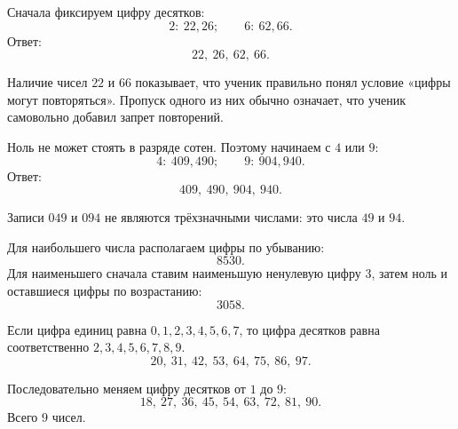 
\clearpage
{}

\begin{teacheranswer}[Задание 1]
  Сначала фиксируем цифру десятков:
  \[
    2:\ 22,26;\qquad 6:\ 62,66.
  \]
  Ответ:
  \[
    \boxed{22,\ 26,\ 62,\ 66}.
  \]
\end{teacheranswer}

\begin{criterionbox}
  Наличие чисел \(22\) и \(66\) показывает, что ученик правильно понял
  условие «цифры могут повторяться». Пропуск одного из них обычно означает,
  что ученик самовольно добавил запрет повторений.
\end{criterionbox}

\begin{teacheranswer}[Задание 2]
  Ноль не может стоять в разряде сотен. Поэтому начинаем с \(4\) или \(9\):
  \[
    4:\ 409,490;\qquad 9:\ 904,940.
  \]
  Ответ:
  \[
    \boxed{409,\ 490,\ 904,\ 940}.
  \]
\end{teacheranswer}

\begin{criterionbox}
  Записи \(049\) и \(094\) не являются трёхзначными числами: это числа
  \(49\) и \(94\).
\end{criterionbox}

\begin{teacheranswer}[Задание 3]
  Для наибольшего числа располагаем цифры по убыванию:
  \[
    \boxed{8530}.
  \]
  Для наименьшего сначала ставим наименьшую ненулевую цифру \(3\), затем
  ноль и оставшиеся цифры по возрастанию:
  \[
    \boxed{3058}.
  \]
\end{teacheranswer}

\begin{teacheranswer}[Задание 4]
  Если цифра единиц равна \(0,1,2,3,4,5,6,7\), то цифра десятков равна
  соответственно \(2,3,4,5,6,7,8,9\).
  \[
    \boxed{20,\ 31,\ 42,\ 53,\ 64,\ 75,\ 86,\ 97}.
  \]
\end{teacheranswer}

\begin{teacheranswer}[Задание 5]
  Последовательно меняем цифру десятков от \(1\) до \(9\):
  \[
    \boxed{18,\ 27,\ 36,\ 45,\ 54,\ 63,\ 72,\ 81,\ 90}.
  \]
  Всего \(9\) чисел.
\end{teacheranswer}

